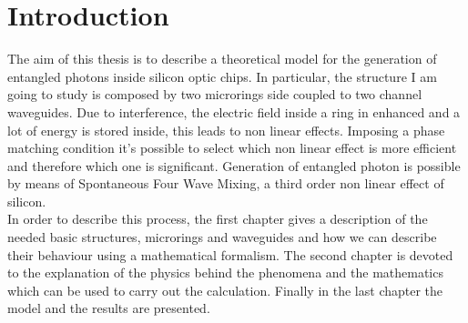 \chapter{Introduction}
The aim of this thesis is to describe a theoretical model for the generation of entangled photons inside silicon optic chips. In particular, the structure I am going to study is composed by two microrings side coupled to two channel waveguides. Due to interference, the electric field inside a ring in enhanced and a lot of energy is stored inside, this leads to non linear effects. Imposing a phase matching condition it's possible to select which non linear effect is more efficient and therefore which one is significant. Generation of entangled photon is possible by means of Spontaneous Four Wave Mixing, a third order non linear effect of silicon.\\
In order to describe this process, the first chapter gives a description of the needed basic structures, microrings and waveguides and how we can describe their behaviour using a mathematical formalism. The second chapter is devoted to the explanation of the physics behind the phenomena and the mathematics which can be used to carry out the calculation. Finally in the last chapter the model and the results are presented.
